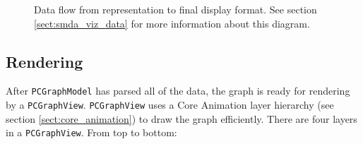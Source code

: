 \begin{figure}[thbp]
    \caption{\label{fig:maw_viz_data} Data flow from \pathcasemaw representation
    to final display format. See section \ref{sect:smda_viz_data} for more
    information about this diagram.}
\end{figure}

\subsection{Rendering}
\label{sect:smda_rendering}

After \texttt{PCGraphModel} has parsed all of the data, the graph is ready for
rendering by a \texttt{PCGraphView}. \texttt{PCGraphView} uses a Core Animation
layer hierarchy (see section \ref{sect:core_animation}) to draw the graph
efficiently. There are four layers in a \texttt{PCGraphView}. From top to
bottom:

